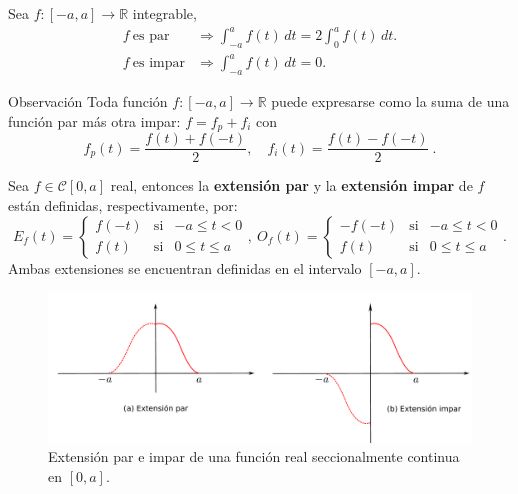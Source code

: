 \begin{propo}
    Sea $f: [-a,a] \longrightarrow \mathbb{R}$ integrable,
    \begin{align*}
        f ~\mbox{es par} &\Rightarrow \int_{-a}^a f(t) \,dt = 2 \int_0^a f(t) \,dt. \\
        f ~\mbox{es impar} &\Rightarrow \int_{-a}^a f(t) \,dt = 0.
    \end{align*}
\end{propo}

\begin{obs}{Observación}
    Toda función $f:[-a,a] \longrightarrow \mathbb{R}$ puede expresarse como la suma de una función par más otra impar: $f = f_p + f_i$ con 
    \begin{equation*}
        f_p(t) = \frac{f(t) + f(-t)}{2}, \quad f_i(t) = \frac{f(t) - f(-t)}{2} \ .
    \end{equation*}
\end{obs}

\begin{defi} 
Sea $f \in \mathscr{C}[0,a]$ real, entonces la \textbf{extensión par} y la \textbf{extensión impar} de $f$ están definidas, respectivamente, por:
\begin{equation*}
    E_f(t) = \left\{ \begin{array}{cll}
    f(-t)     & \mbox{si} & -a \leq t < 0 \\
    f(t)     & \mbox{si} & 0 \leq t \leq a
    \end{array} \right. , ~ O_f(t) = \left\{ \begin{array}{cll}
    -f(-t)     & \mbox{si} & -a \leq t < 0 \\
    f(t)     & \mbox{si} & 0 \leq t \leq a
    \end{array} \right. .
\end{equation*}
Ambas extensiones se encuentran definidas en el intervalo $[-a,a]$.
\end{defi}

\begin{figure}[H]
    \centering
    \includegraphics[width = \textwidth]{Figuras/Paridad.pdf}
    \caption{Extensión par e impar de una función real seccionalmente continua en $[0,a]$. }
\end{figure}

